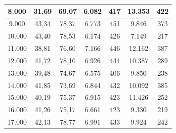 \begin{table}[ht]
\begin{tabular}{|c|c|c|c|c|c|c|}
8.000               & 31,69                                                             & 69,07                                                          & 6.082              & 417             & 13.353             & 422             \\ \hline
9.000               & 43,34                                                             & 78,37                                                          & 6.773              & 451             & 9.846              & 373             \\ \hline
10.000              & 43,40                                                             & 78,53                                                          & 6.174              & 426             & 7.149              & 217             \\ \hline
11.000              & 38,81                                                             & 76,60                                                          & 7.166              & 446             & 12.162             & 387             \\ \hline
12.000              & 41,72                                                             & 78,10                                                          & 6.926              & 444             & 10.387             & 289             \\ \hline
13.000              & 39,48                                                             & 74,67                                                          & 6.575              & 406             & 9.850              & 238             \\ \hline
14.000              & 41,85                                                             & 73,69                                                          & 6.844              & 432             & 10.092             & 385             \\ \hline
15.000              & 40,19                                                             & 75,37                                                          & 6.915              & 423             & 11.426             & 252             \\ \hline
16.000              & 41,26                                                             & 75,17                                                          & 6.661              & 423             & 9.330              & 219             \\ \hline
17.000              & 42,13                                                             & 78,77                                                          & 6.991              & 433             & 9.924              & 242             \\ \hline

\end{tabular}
\end{table}

